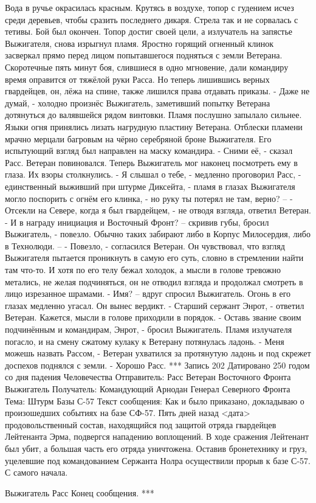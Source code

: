 \documentclass[a4paper, 12pt]{report}
\begin{document}
Вода в ручье окрасилась красным.
Крутясь в воздухе, топор с гудением исчез среди деревьев, чтобы сразить последнего дикаря. Стрела так и не сорвалась с тетивы. Бой был окончен.
Топор достиг своей цели, а излучатель на запястье Выжигателя, снова изрыгнул пламя. Яростно горящий огненный клинок засверкал прямо перед лицом попытавшегося подняться с земли Ветерана. Скоротечные пять минут боя, слившиеся в одно мгновение, дали командиру время оправится от тяжёлой руки Расса. Но теперь лишившись верных гвардейцев, он, лёжа на спине, также лишился права отдавать приказы.
- Даже не думай, - холодно произнёс Выжигатель, заметивший попытку Ветерана дотянуться до валявшейся рядом винтовки. Пламя послушно запылало сильнее. Языки огня принялись лизать нагрудную пластину Ветерана. Отблески пламени мрачно мерцали багровым на чёрно серебряной броне Выжигателя. Его испытующий взгляд был направлен на маску командира.
- Сними её, - сказал Расс. Ветеран повиновался.
Теперь Выжигатель мог наконец посмотреть ему в глаза. Их взоры столкнулись.
- Я слышал о тебе, - медленно проговорил Расс, - единственный выживший при штурме Диксейта, - пламя в глазах Выжигателя могло поспорить с огнём его клинка, -  но руку ты потерял не там, верно? –
- Отсекли на Севере, когда я был гвардейцем, - не отводя взгляда, ответил Ветеран.
- И в награду инициация и Восточный Фронт? – скривив губы, бросил Выжигатель, - повезло. Обычно таких забирают либо в Корпус Милосердия, либо в Технолюди. –
- Повезло, - согласился Ветеран. Он чувствовал, что взгляд Выжигателя пытается проникнуть в самую его суть, словно в стремлении найти там что-то. И хотя по его телу бежал холодок, а мысли в голове тревожно метались, не желая подчиняться, он не отводил взгляда и продолжал смотреть в лицо изрезанное шрамами.  
- Имя? – вдруг спросил Выжигатель. Огонь в его глазах медленно угасал. Он вынес вердикт.
- Старший сержант Энрот, - ответил Ветеран. Кажется, мысли в голове приходили в порядок.
- Оставь звание своим подчинённым и командирам, Энрот, - бросил Выжигатель.
Пламя излучателя погасло, и на смену сжатому кулаку к Ветерану потянулась ладонь.
- Меня можешь назвать Рассом, -
Ветеран ухватился за протянутую ладонь и под скрежет доспехов поднялся с земли.
- Хорошо Расс.
***
Запись 202
Датировано 250 годом со дня падения Человечества
Отправитель: Расс Ветеран Восточного Фронта Выжигатель
Получатель:  Командующий Арнодан Генерал Северного Фронта
Тема: Штурм Базы С-57
Текст сообщения:	
	Как и было приказано, докладываю о произошедших событиях на базе СФ-57.
	Пять дней назад <дата> продовольственный состав, находящийся под защитой отряда гвардейцев Лейтенанта Эрма, подвергся нападению воплощений. В ходе сражения  Лейтенант был убит, а большая часть его отряда уничтожена. Оставив бронетехнику и груз, уцелевшие под командованием Сержанта Нолра осуществили прорыв к базе С-57.
С самого начала.
	
   
	
Выжигатель Расс
Конец сообщения. 
***
\end{document}
